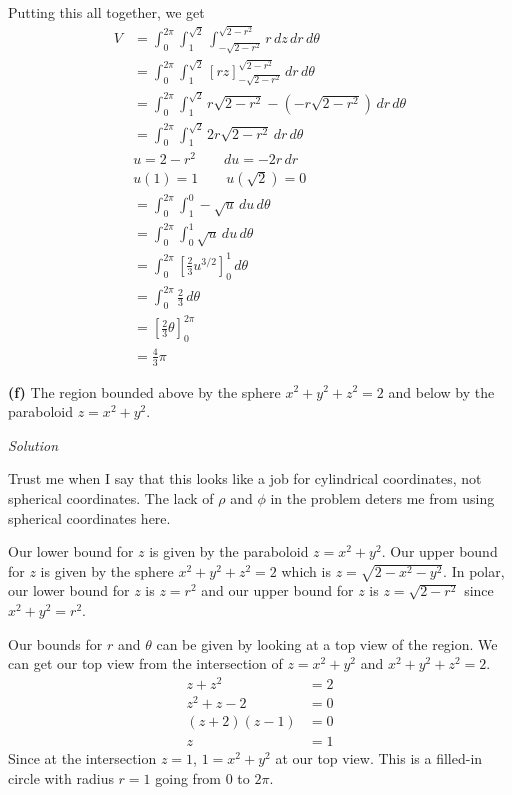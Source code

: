 \documentclass{article}
\newcommand{\lrb}[1]{\left[ #1 \right]}
\newcommand{\Solution}{\textit{Solution}}
\begin{document}
Putting this all together, we get
\begin{align*}
    V&=\int_0^{2\pi}\int_1^{\sqrt{2}}\int_{-\sqrt{2-r^2}}^{\sqrt{2-r^2}}r\,dz\,dr\,d\theta\\
    &=\int_0^{2\pi}\int_1^{\sqrt{2}}\lrb{rz}_{-\sqrt{2-r^2}}^{\sqrt{2-r^2}}\,dr\,d\theta\\
    &=\int_0^{2\pi}\int_1^{\sqrt{2}} r\sqrt{2-r^2}-(-r\sqrt{2-r^2})\,dr\,d\theta\\
    &=\int_0^{2\pi}\int_1^{\sqrt{2}} 2r\sqrt{2-r^2}\,dr\,d\theta\\
    &u=2-r^2 \hspace{2em} du=-2r\,dr\\
    &u(1)=1\hspace{2em}u(\sqrt{2})=0\\
    &=\int_0^{2\pi}\int_1^0 -\sqrt{u}\,du\,d\theta\\
    &=\int_0^{2\pi}\int_0^1 \sqrt{u}\,du\,d\theta\\
    &=\int_0^{2\pi}\lrb{\frac{2}{3}u^{3/2}}_0^1\,d\theta\\
    &=\int_0^{2\pi}\frac{2}{3}\,d\theta\\
    &=\lrb{\frac{2}{3}\theta}_0^{2\pi}\\
    &=\boxed{\frac{4}{3}\pi}
\end{align*}

{}\textbf{(f)} The region bounded above by the sphere $x^2 + y^2 + z^2 = 2$ and below by the paraboloid $z = x^2 + y^2$.

\Solution

Trust me when I say that this looks like a job for cylindrical coordinates, not spherical coordinates. The lack of $\rho$ and $\phi$ in the problem deters me from using spherical coordinates here.

Our lower bound for $z$ is given by the paraboloid $z=x^2+y^2$. Our upper bound for $z$ is given by the sphere $x^2+y^2+z^2=2$ which is $z=\sqrt{2-x^2-y^2}$. In polar, our lower bound for $z$ is $z=r^2$ and our upper bound for $z$ is $z=\sqrt{2-r^2}$ since $x^2+y^2=r^2$.

Our bounds for $r$ and $\theta$ can be given by looking at a top view of the region. We can get our top view from the intersection of $z=x^2+y^2$ and $x^2+y^2+z^2=2$.
\begin{align*}
    z+z^2&=2\\
    z^2+z-2&=0\\
    (z+2)(z-1)&=0\\
    z&=1\tag{only positive $z$!}
\end{align*}
Since at the intersection $z=1$, $1=x^2+y^2$ at our top view. This is a filled-in circle with radius $r=1$ going from $0$ to $2\pi$.
\end{document}
